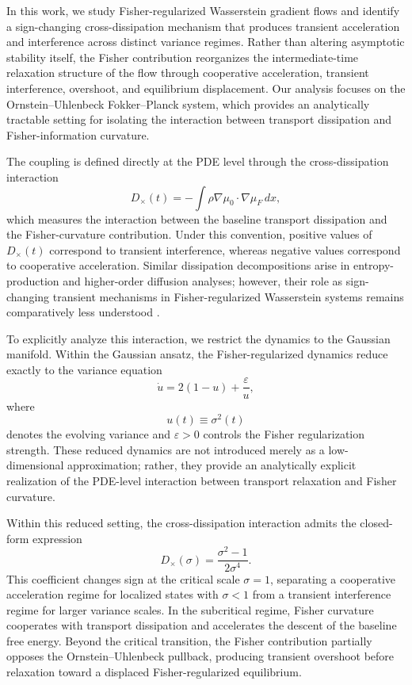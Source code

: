 \documentclass[aps,prl,twocolumn,10pt,superscriptaddress]{revtex4-2}
\begin{document}
In this work, we study Fisher-regularized Wasserstein gradient flows and identify a sign-changing cross-dissipation mechanism that produces transient acceleration and interference across distinct variance regimes. Rather than altering asymptotic stability itself, the Fisher contribution reorganizes the intermediate-time relaxation structure of the flow through cooperative acceleration, transient interference, overshoot, and equilibrium displacement. Our analysis focuses on the Ornstein--Uhlenbeck Fokker--Planck system, which provides an analytically tractable setting for isolating the interaction between transport dissipation and Fisher-information curvature.

The coupling is defined directly at the PDE level through the cross-dissipation interaction
\[
D_\times(t)
=
-
\int
\rho \nabla \mu_0 \cdot \nabla \mu_F \, dx,
\]
which measures the interaction between the baseline transport dissipation and the Fisher-curvature contribution. Under this convention, positive values of $D_\times(t)$ correspond to transient interference, whereas negative values correspond to cooperative acceleration. Similar dissipation decompositions arise in entropy-production and higher-order diffusion analyses; however, their role as sign-changing transient mechanisms in Fisher-regularized Wasserstein systems remains comparatively less understood \cite{arnold2001convex,gianazza2009wasserstein,jungel2009transport,matthes2009family}.

To explicitly analyze this interaction, we restrict the dynamics to the Gaussian manifold. Within the Gaussian ansatz, the Fisher-regularized dynamics reduce exactly to the variance equation
\[
\dot{u}
=
2(1-u)
+
\frac{\varepsilon}{u},
\]
where
\[
u(t)\equiv\sigma^2(t)
\]
denotes the evolving variance and $\varepsilon>0$ controls the Fisher regularization strength. These reduced dynamics are not introduced merely as a low-dimensional approximation; rather, they provide an analytically explicit realization of the PDE-level interaction between transport relaxation and Fisher curvature.

Within this reduced setting, the cross-dissipation interaction admits the closed-form expression
\[
D_\times(\sigma)
=
\frac{\sigma^2-1}{2\sigma^4}.
\]
This coefficient changes sign at the critical scale $\sigma=1$, separating a cooperative acceleration regime for localized states with $\sigma<1$ from a transient interference regime for larger variance scales. In the subcritical regime, Fisher curvature cooperates with transport dissipation and accelerates the descent of the baseline free energy. Beyond the critical transition, the Fisher contribution partially opposes the Ornstein--Uhlenbeck pullback, producing transient overshoot before relaxation toward a displaced Fisher-regularized equilibrium.
\end{document}
